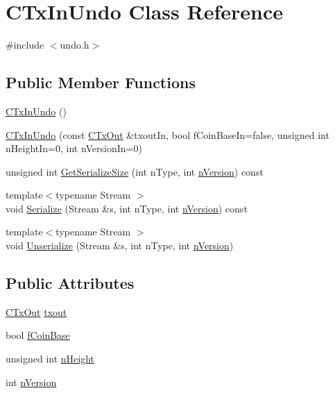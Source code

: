 \hypertarget{class_c_tx_in_undo}{}\section{C\+Tx\+In\+Undo Class Reference}
\label{class_c_tx_in_undo}


{\ttfamily \#include $<$undo.\+h$>$}

\subsection*{Public Member Functions}
\begin{DoxyCompactItemize}
\item 
\hyperlink{class_c_tx_in_undo_a9f8d4a16f1cb14fcec729becdb944003}{C\+Tx\+In\+Undo} ()
\item 
\hyperlink{class_c_tx_in_undo_a9f4da076d789bf5fa3f6d8d4b1d7d6fd}{C\+Tx\+In\+Undo} (const \hyperlink{class_c_tx_out}{C\+Tx\+Out} \&txout\+In, bool f\+Coin\+Base\+In=false, unsigned int n\+Height\+In=0, int n\+Version\+In=0)
\item 
unsigned int \hyperlink{class_c_tx_in_undo_a6f992d64f9d4ee6299cbd3305e4fd90f}{Get\+Serialize\+Size} (int n\+Type, int \hyperlink{class_c_tx_in_undo_a193281289475ca792e436a7a02de23ef}{n\+Version}) const 
\item 
{\footnotesize template$<$typename Stream $>$ }\\void \hyperlink{class_c_tx_in_undo_a37cebff3e836226b36e51d91e7cc2739}{Serialize} (Stream \&s, int n\+Type, int \hyperlink{class_c_tx_in_undo_a193281289475ca792e436a7a02de23ef}{n\+Version}) const 
\item 
{\footnotesize template$<$typename Stream $>$ }\\void \hyperlink{class_c_tx_in_undo_a0a2b82f03edad7ad85a66e63e4552af9}{Unserialize} (Stream \&s, int n\+Type, int \hyperlink{class_c_tx_in_undo_a193281289475ca792e436a7a02de23ef}{n\+Version})
\end{DoxyCompactItemize}
\subsection*{Public Attributes}
\begin{DoxyCompactItemize}
\item 
\hyperlink{class_c_tx_out}{C\+Tx\+Out} \hyperlink{class_c_tx_in_undo_a0eb1374984b5b68b0af14d88d7d4b821}{txout}
\item 
bool \hyperlink{class_c_tx_in_undo_a5952f917224de3a2193157b856c47864}{f\+Coin\+Base}
\item 
unsigned int \hyperlink{class_c_tx_in_undo_af022118f015a9b1b9ab96e04e8452292}{n\+Height}
\item 
int \hyperlink{class_c_tx_in_undo_a193281289475ca792e436a7a02de23ef}{n\+Version}
\end{DoxyCompactItemize}


